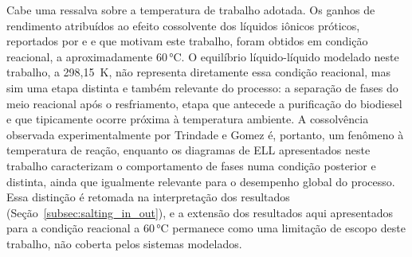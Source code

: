 \begin{figure}[H]
{%
}
\end{figure}

Cabe uma ressalva sobre a temperatura de trabalho adotada. Os ganhos de rendimento atribuídos ao efeito cossolvente dos líquidos iônicos próticos, reportados por  e  e que motivam este trabalho, foram obtidos em condição reacional, a aproximadamente 60\,°C. O equilíbrio líquido-líquido modelado neste trabalho, a 298,15~K, não representa diretamente essa condição reacional, mas sim uma etapa distinta e também relevante do processo: a separação de fases do meio reacional após o resfriamento, etapa que antecede a purificação do biodiesel e que tipicamente ocorre próxima à temperatura ambiente. A cossolvência observada experimentalmente por Trindade e Gomez é, portanto, um fenômeno à temperatura de reação, enquanto os diagramas de ELL apresentados neste trabalho caracterizam o comportamento de fases numa condição posterior e distinta, ainda que igualmente relevante para o desempenho global do processo. Essa distinção é retomada na interpretação dos resultados (Seção~\ref{subsec:salting_in_out}), e a extensão dos resultados aqui apresentados para a condição reacional a 60\,°C permanece como uma limitação de escopo deste trabalho, não coberta pelos sistemas modelados.

